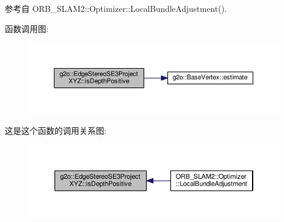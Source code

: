 参考自 O\-R\-B\-\_\-\-S\-L\-A\-M2\-::\-Optimizer\-::\-Local\-Bundle\-Adjustment().



函数调用图\-:
\nopagebreak
\begin{figure}[H]
\begin{center}
\leavevmode
\includegraphics[width=350pt]{classg2o_1_1EdgeStereoSE3ProjectXYZ_ac176aff8aa08a73f52d7a0f5c3080d4d_cgraph}
\end{center}
\end{figure}




这是这个函数的调用关系图\-:
\nopagebreak
\begin{figure}[H]
\begin{center}
\leavevmode
\includegraphics[width=350pt]{classg2o_1_1EdgeStereoSE3ProjectXYZ_ac176aff8aa08a73f52d7a0f5c3080d4d_icgraph}
\end{center}
\end{figure}


